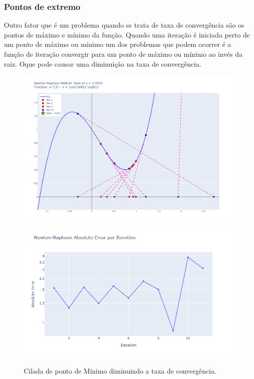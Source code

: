 \subsubsection{Pontos de extremo}
Outro fator que é um problema quando se trata de taxa de convergência são os pontos de máximo e mínimo da função. Quando uma iteração é iniciada perto de um ponto de máximo ou mínimo um dos problemas que podem ocorrer é a função de iteração convergir para um ponto de máximo ou mínimo ao invés da raiz. Oque pode causar uma diminuição na taxa de convergência.
\begin{figure}[H]
    \centering 
    \includegraphics[width=1\textwidth]{Imagens/pitfalls/02/max_min.png}
    \includegraphics[width=1\textwidth]{Imagens/pitfalls/02/err_max_min.png}
    \caption{Cilada de ponto de Mínimo diminuindo a taxa de convergência.}
    \label{fig:ciladaMinMax_A}
\end{figure}

